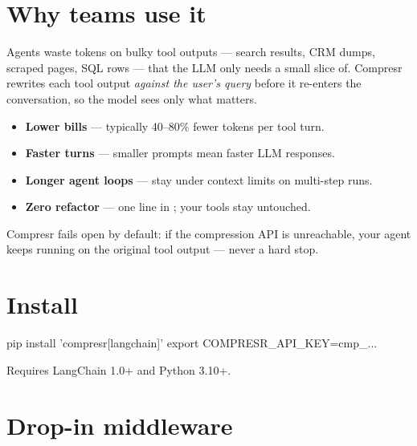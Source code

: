 \documentclass[10pt]{article}
\begin{document}

\section{Why teams use it}

Agents waste tokens on bulky tool outputs — search results, CRM dumps,
scraped pages, SQL rows — that the LLM only needs a small slice of.
Compresr rewrites each tool output \emph{against the user's query} before
it re-enters the conversation, so the model sees only what matters.

\begin{itemize}
    \item \textbf{Lower bills} — typically 40–80\% fewer tokens per tool turn.
    \item \textbf{Faster turns} — smaller prompts mean faster LLM responses.
    \item \textbf{Longer agent loops} — stay under context limits on
          multi-step runs.
    \item \textbf{Zero refactor} — one line in
          ; your tools stay untouched.
\end{itemize}

Compresr fails open by default: if the compression API is unreachable,
your agent keeps running on the original tool output — never a hard stop.

\section{Install}

\begin{shcode}
pip install 'compresr[langchain]'
export COMPRESR_API_KEY=cmp_...
\end{shcode}

Requires LangChain 1.0+ and Python 3.10+.

\section{Drop-in middleware}
\end{document}
